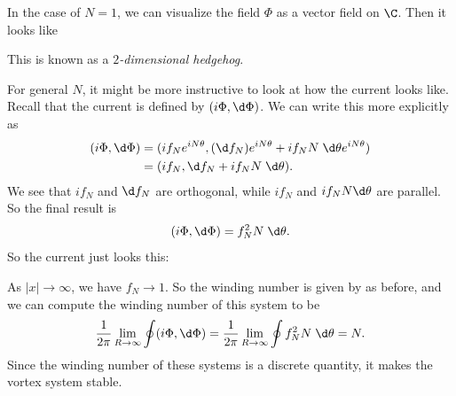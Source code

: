 \documentclass[a4paper]{article}
\begin{document}
In the case of $N = 1$, we can visualize the field $\Phi$ as a vector field on $\C$. Then it looks like
\begin{center}
\end{center}
This is known as a \emph{$2$-dimensional hedgehog}.

For general $N$, it might be more instructive to look at how the current looks like. Recall that the current is defined by $(i\Phi, \d \Phi)$. We can write this more explicitly as
\begin{align*}
  (i\Phi, \d \Phi) &= (if_N e^{iN\theta}, (\d f_N) e^{iN\theta} + i f_N N\;\d \theta e^{iN\theta})\\
  &= (if_N,\d f_N + i f_N N\;\d \theta).
\end{align*}
We see that $if_N$ and $\d f_N$ are orthogonal, while $i f_N$ and $i f_N N \d \theta$ are parallel. So the final result is
\[
  (i\Phi, \d \Phi) = f_N^2 N\;\d \theta.
\]
So the current just looks this:

\begin{center}
\end{center}

As $|x| \to \infty$, we have $f_N \to 1$. So the winding number is given by as before, and we can compute the winding number of this system to be
\[
  \frac{1}{2\pi} \lim_{R \to \infty} \oint (i \Phi, \d \Phi) = \frac{1}{2\pi} \lim_{R \to \infty} \oint f_N^2 N \;\d \theta = N.
\]
Since the winding number of these systems is a discrete quantity, it makes the vortex system stable.
\end{document}
